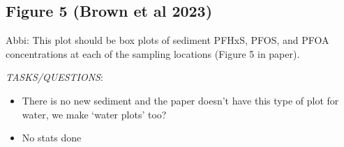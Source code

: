 \documentclass[
]{article}
\providecommand{\tightlist}{%
  \setlength{\itemsep}{0pt}\setlength{\parskip}{0pt}}
\begin{document}
\subsection{Figure 5 (Brown et al
2023)}\label{figure-5-brown-et-al-2023}

Abbi: This plot should be box plots of sediment PFHxS, PFOS, and PFOA
concentrations at each of the sampling locations (Figure 5 in paper).

\emph{TASKS/QUESTIONS}:

\begin{itemize}
\tightlist
\item
  There is no new sediment and the paper doesn't have this type of plot
  for water, we make `water plots' too?
\item
  No stats done
\end{itemize}
\end{document}
